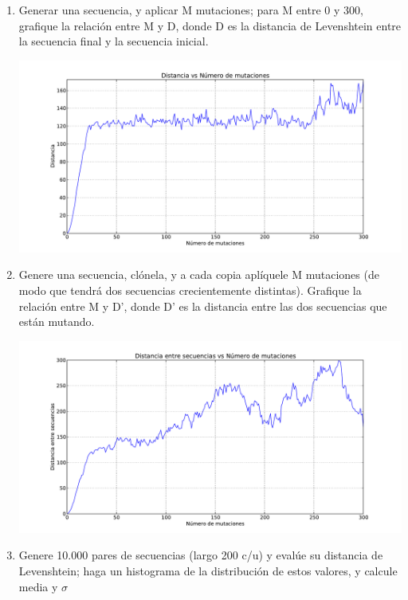 \begin{enumerate}

	\item Generar una secuencia, y aplicar M mutaciones; para M entre 0 y 300, grafique la relación
		entre M y D, donde D es la distancia de Levenshtein entre la secuencia final y la secuencia
		inicial.


		\begin{center}
			\includegraphics[width=\textwidth]{scripts/pregunta-2-1.pdf}
		\end{center}


	\item Genere una secuencia, clónela, y a cada copia aplíquele M mutaciones (de modo que tendrá
		dos secuencias crecientemente distintas). Grafique la relación entre M y D’, donde D’ es la
		distancia entre las dos secuencias que están mutando.


		\begin{center}
			\includegraphics[width=\textwidth]{scripts/pregunta-2-2.pdf}
		\end{center}


	\item Genere 10.000 pares de secuencias (largo 200 c/u) y evalúe su distancia de Levenshtein; haga
		un histograma de la distribución de estos valores, y calcule media y $\sigma$


\end{enumerate}
